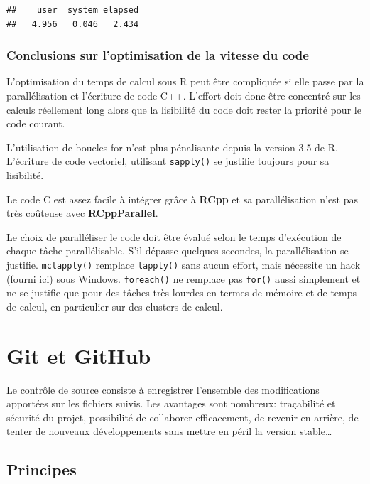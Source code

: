 \documentclass[
  11pt,
  french,
  a4paper,
  extrafontsizes,onecolumn,openright
  ]{memoir}
\begin{document}
\begin{verbatim}
##    user  system elapsed 
##   4.956   0.046   2.434
\end{verbatim}

\normalsize

\hypertarget{conclusions-sur-loptimisation-de-la-vitesse-du-code}{%
\subsection{Conclusions sur l'optimisation de la vitesse du code}\label{conclusions-sur-loptimisation-de-la-vitesse-du-code}}

L'optimisation du temps de calcul sous R peut être compliquée si elle passe par la parallélisation et l'écriture de code C++.
L'effort doit donc être concentré sur les calculs réellement long alors que la lisibilité du code doit rester la priorité pour le code courant.

L'utilisation de boucles for n'est plus pénalisante depuis la version 3.5 de R.
L'écriture de code vectoriel, utilisant \texttt{sapply()} se justifie toujours pour sa lisibilité.

Le code C est assez facile à intégrer grâce à \textbf{RCpp} et sa parallélisation n'est pas très coûteuse avec \textbf{RCppParallel}.

Le choix de paralléliser le code doit être évalué selon le temps d'exécution de chaque tâche parallélisable.
S'il dépasse quelques secondes, la parallélisation se justifie.
\texttt{mclapply()} remplace \texttt{lapply()} sans aucun effort, mais nécessite un hack (fourni ici) sous Windows.
\texttt{foreach()} ne remplace pas \texttt{for()} aussi simplement et ne se justifie que pour des tâches très lourdes en termes de mémoire et de temps de calcul, en particulier sur des clusters de calcul.

\hypertarget{chap:git}{%
\chapter{Git et GitHub}\label{chap:git}}

Le contrôle de source consiste à enregistrer l'ensemble des modifications apportées sur les fichiers suivis.
Les avantages sont nombreux: traçabilité et sécurité du projet, possibilité de collaborer efficacement, de revenir en arrière, de tenter de nouveaux développements sans mettre en péril la version stable\ldots{}

\hypertarget{sec:principes-git}{%
\section{Principes}\label{sec:principes-git}}
\end{document}
